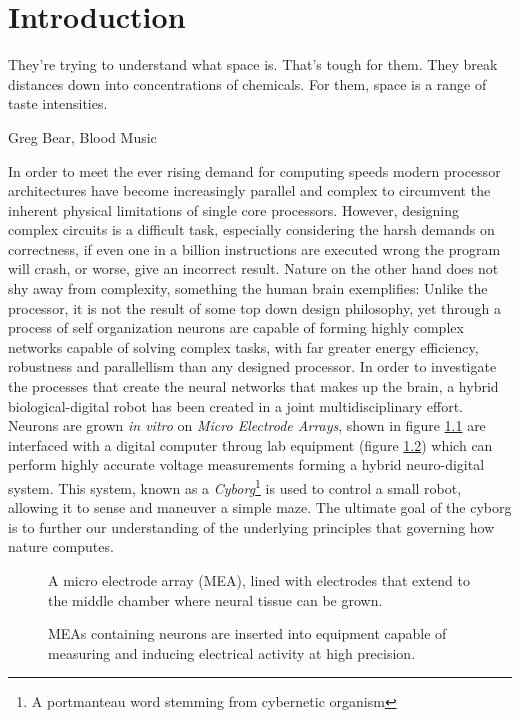 \chapter{Introduction}
\epigraph{They're trying to understand what space is. That's tough for them.
They break distances down into concentrations of chemicals. For them, space is a
range of taste intensities.}{Greg Bear, Blood Music}
%
In order to meet the ever rising demand for computing speeds modern processor
architectures have become increasingly parallel and complex to circumvent
the inherent physical limitations of single core processors.
%
However, designing complex circuits is a difficult task, especially considering
the harsh demands on correctness, if even one in a billion instructions are
executed wrong the program will crash, or worse, give an incorrect result.
%
Nature on the other hand does not shy away from complexity, something the human
brain exemplifies:
%
Unlike the processor, it is not the result of some top down design
philosophy, yet through a process of self organization neurons are capable of
forming highly complex networks capable of solving complex tasks, with far
greater energy efficiency, robustness and parallellism than any designed
processor.
%
In order to investigate the processes that create the neural networks that makes
up the brain, a hybrid biological-digital robot has been created in a joint
multidisciplinary effort. 
%
Neurons are grown \emph{in vitro} on \emph{Micro Electrode Arrays}, shown in
figure \ref{neuroIntro} are interfaced with a digital computer throug lab
equipment (figure \ref{figEquipmentIntro}) which can perform highly accurate
voltage measurements forming a hybrid neuro-digital system. 
%
This system, known as a \emph{Cyborg}\footnote{A portmanteau word stemming from
  cybernetic organism} is used to control a small robot, allowing it to sense
and maneuver a simple maze.
%
The ultimate goal of the cyborg is to further our understanding of the
underlying principles that governing how nature computes.
%
\begin{figure}[h!]
  \centering
  \qquad
  \caption[A micro electrode array]{
    A micro electrode array (MEA), lined with electrodes that extend to the
    middle chamber where neural tissue can be grown.
  }
  \label{neuroIntro}%
\end{figure}
%
%
\begin{figure}[h!]
  \centering
  \qquad
  \caption[An MEA being measured]{
    MEAs containing neurons are inserted into equipment capable of measuring and
    inducing electrical activity at high precision.
  }
  \label{figEquipmentIntro}%
\end{figure}
